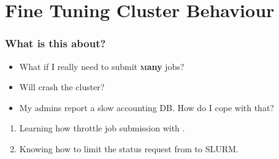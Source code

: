 \section{Fine Tuning Cluster Behaviour}
{   
}


\begin{frame}
	\frametitle{What is this about?}
	\begin{question}[Questions]
		\begin{itemize}
			\item What if I really need to submit \textbf{\textsc many} jobs?
	        \item Will crash the cluster?
	        \item My admins report a slow accounting DB. How do I cope with that?
		\end{itemize}
	\end{question}
	\begin{docs}[Objectives]
		\begin{enumerate}
			\item Learning how throttle job submission with \Snakemake{}.
			\item Knowing how to limit the status request from \Snakemake to SLURM.
		\end{enumerate}
	\end{docs}
\end{frame}

